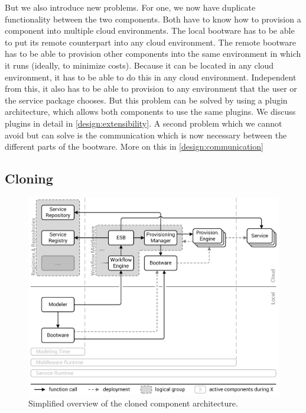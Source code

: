 But we also introduce new problems.
For one, we now have duplicate functionality between the two components.
Both have to know how to provision a component into multiple cloud environments.
The local bootware has to be able to put its remote counterpart into any cloud environment.
The remote bootware has to be able to provision other components into the same environment in which it runs (ideally, to minimize costs).
Because it can be located in any cloud environment, it has to be able to do this in any cloud environment.
Independent from this, it also has to be able to provision to any environment that the user or the service package chooses.
But this problem can be solved by using a plugin architecture, which allows both components to use the same plugins.
We discuss plugins in detail in \autoref{design:extensibility}.
A second problem which we cannot avoid but can solve is the communication which is now necessary between the different parts of the bootware.
More on this in \autoref{design:communication}

\subsection{Cloning}

\begin{figure}[!htbp]
	\centering
	\includegraphics[resolution=600]{design/assets/clone}
	\caption{Simplified overview of the cloned component architecture.}
	\label{image:clone}
\end{figure}

